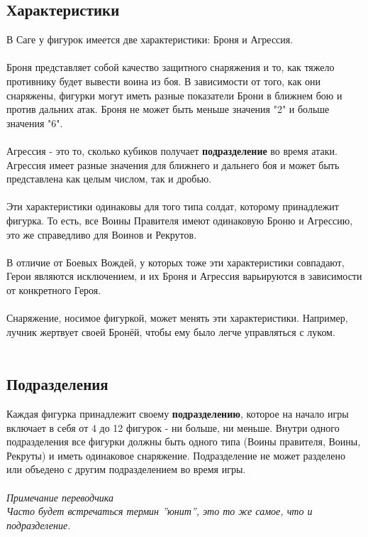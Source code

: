 \documentclass[a4paper,11pt,twoside]{article}
\begin{document}
\subsection*{Характеристики}

В Саге у фигурок имеется две характеристики: Броня и Агрессия.  \\ \\
Броня представляет собой качество защитного снаряжения и то, как тяжело противнику будет вывести воина из боя. В зависимости от того, как они снаряжены, фигурки могут иметь разные показатели Брони в ближнем бою и против дальних атак. Броня не может быть меньше значения "2" и больше значения "6". \\ \\
Агрессия - это то, сколько кубиков получает \textbf{подразделение} во время атаки. Агрессия имеет разные значения для ближнего и дальнего боя и может быть представлена как целым числом, так и дробью. \\ \\ 
Эти характеристики одинаковы для того типа солдат, которому принадлежит фигурка. То есть, все Воины Правителя имеют одинаковую Броню и Агрессию, это же справедливо для Воинов и Рекрутов. \\ \\
В отличие от Боевых Вождей, у которых тоже эти характеристики совпадают, Герои являются исключением, и их Броня и Агрессия варьируются в зависимости от конкретного Героя. \\ \\
Снаряжение, носимое фигуркой, может менять эти характеристики. Например, лучник жертвует своей Бронёй, чтобы ему было легче управляться с луком. \\ \\

\subsection*{Подразделения}

Каждая фигурка принадлежит своему \textbf{подразделению}, которое на начало игры включает в себя от 4 до 12 фигурок - ни больше, ни меньше. Внутри одного подразделения все фигурки должны быть одного типа (Воины правителя, Воины, Рекруты) и иметь одинаковое снаряжение. Подразделение не может разделено или объедено с другим подразделением во время игры. \\ \\ 

\textit{Примечание переводчика} \\
\textit{Часто будет встречаться термин ''юнит'', это то же самое, что и подразделение.} \\ \\
\end{document}
